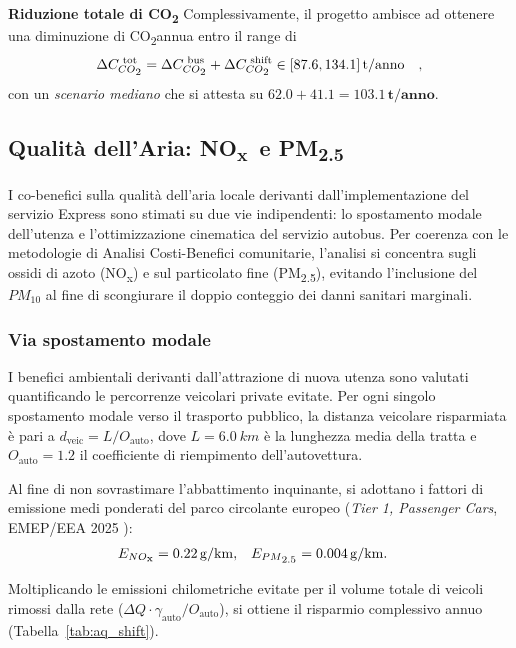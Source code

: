 \documentclass[conference]{IEEEtran}
\newcommand{\co}{CO\textsubscript{2}}
\newcommand{\nox}{NO\textsubscript{x}}
\newcommand{\pmtwo}{PM\textsubscript{2.5}}
\begin{document}
\textbf{Riduzione totale di \co} Complessivamente, il progetto ambisce ad ottenere una diminuzione di \co annua entro il range di 
\begin{equation}
  \Delta C_{\co}^{\text{ tot}} = \Delta C_{\co}^{\text{ bus}} + \Delta C_{\co}^{\text{ shift}} \in [87.6, 134.1] \, \text{t/anno} \quad,
\end{equation}
con un \emph{scenario mediano} che si attesta su
$62.0 + 41.1 = \bm{{103.1} \, \text{t/anno}}$.

\subsection{Qualità dell'Aria: \nox\ e \pmtwo}

I co-benefici sulla qualità dell'aria locale derivanti dall'implementazione del servizio Express sono stimati su due vie indipendenti: lo spostamento modale dell'utenza e l'ottimizzazione cinematica del servizio autobus. Per coerenza con le metodologie di Analisi Costi-Benefici comunitarie, l'analisi si concentra sugli ossidi di azoto (\nox) e sul particolato fine (\pmtwo), evitando l'inclusione del $PM_{10}$ al fine di scongiurare il doppio conteggio dei danni sanitari marginali.

\subsubsection{Via spostamento modale}
I benefici ambientali derivanti dall'attrazione di nuova utenza sono valutati quantificando le percorrenze veicolari private evitate. Per ogni singolo spostamento modale verso il trasporto pubblico, la distanza veicolare risparmiata è pari a $d_\text{veic} = L/O_\text{auto}$, dove $L = \SI{6.0}{km}$ è la lunghezza media della tratta e $O_\text{auto} = 1.2$ il coefficiente di riempimento dell'autovettura.

Al fine di non sovrastimare l'abbattimento inquinante, si adottano i fattori di emissione medi ponderati del parco circolante europeo (\textit{Tier 1, Passenger Cars}, EMEP/EEA 2025 \cite{eea_guidebook2025}):
\begin{align}
  E_{\nox}  &= \SI{0,22}{g/km}, &
  E_{\pmtwo} &= \SI{0,004}{g/km}.
  \label{eq:ef_car}
\end{align}

Moltiplicando le emissioni chilometriche evitate per il volume totale di veicoli rimossi dalla rete ($\Delta Q \cdot \gamma_{\text{auto}} / O_\text{auto}$), si ottiene il risparmio complessivo annuo (Tabella~\ref{tab:aq_shift}).
\end{document}
